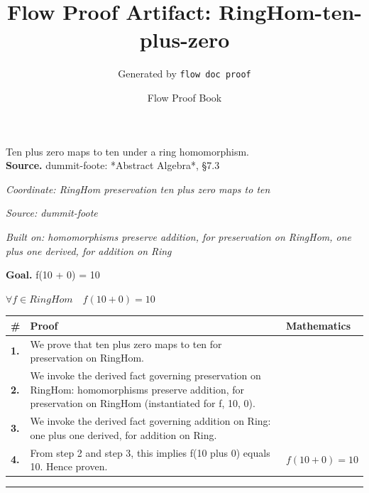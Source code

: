 \documentclass[11pt]{article}
\title{Flow Proof Artifact: RingHom-ten-plus-zero}
\author{Generated by \texttt{flow doc proof}}
\date{Flow Proof Book}
\theoremstyle{definition}
\begin{document}
\maketitle
Ten plus zero maps to ten under a ring homomorphism.\\[0.5em]
\textbf{Source.} dummit-foote: *Abstract Algebra*, §7.3\\[0.5em]
\bigskip
{}\par
\smallskip\noindent\textit{Coordinate: RingHom \cdot preservation \cdot ten plus zero maps to ten}\par
\smallskip\noindent\textit{Source: dummit-foote}\par
\smallskip\noindent\textit{Built on: homomorphisms preserve addition, for preservation on RingHom, one plus one derived, for addition on Ring}\par
\medskip
\noindent\textbf{Goal.} f(10 + 0) = 10\par
\noindent$\displaystyle \forall f \in RingHom\quad f(10 + 0) = 10$\par
\medskip
\noindent
\begin{tabular}{@{} >{\raggedright\arraybackslash}p{} >{\raggedright\arraybackslash}p{} >{\raggedleft\arraybackslash}p{} @{}}
\textbf{\#} & \textbf{Proof} & \textbf{Mathematics} \\
\midrule
\textbf{1.} & We prove that ten plus zero maps to ten for preservation on RingHom. & \\[0.45em]
\textbf{2.} & We invoke the derived fact governing preservation on RingHom: homomorphisms preserve addition, for preservation on RingHom (instantiated for f, 10, 0). & \\[0.45em]
\textbf{3.} & We invoke the derived fact governing addition on Ring: one plus one derived, for addition on Ring. & \\[0.45em]
\textbf{4.} & From step 2 and step 3, this implies f(10 plus 0) equals 10. Hence proven. & $\displaystyle f(10 + 0) = 10$ \\[0.45em]
\bottomrule
\end{tabular}
\label{thm:RingHom-preservation-ten_plus_zero_maps_to_ten}
\par\medskip\hrule
\end{document}

